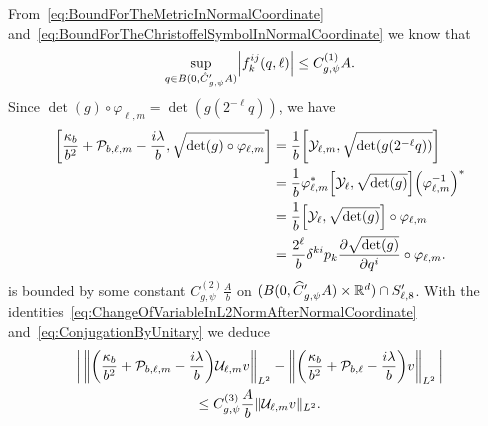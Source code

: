 \documentclass[10pt]{amsart}
\theoremstyle{definition}\newtheorem{defi}[theo]{Definition}\newtheorem{rema}[theo]{Remark}\newtheorem{exam}[theo]{Example}\newtheorem{exem}[theo]{Example}\newtheorem{nota}[theo]{Notation}
\newcommand{\R}{\mathbb{R}}
\newcommand{\clY}{\mathcal{Y}}
\newcommand{\clP}{\mathcal{P}}
\newcommand{\clU}{\mathcal{U}}
\let\oldhat\hat
\renewcommand*{\hat}[1]{\mathchoice{\widehat{#1}}{\widehat{#1}}{\oldhat{#1}}{\oldhat{#1}}}
\let\originalleft\left
\let\originalright\right
\renewcommand{\left}{\mathopen{}\mathclose\bgroup\originalleft}
\renewcommand{\right}{\aftergroup\egroup\originalright}
\begin{document}
From~\eqref{eq:BoundForTheMetricInNormalCoordinate} and~\eqref{eq:BoundForTheChristoffelSymbolInNormalCoordinate} we know that
\begin{equation}\label{eq:BoundForfijk}
\sup_{q\in B(0,\hat{C}'_{g,\psi}A)} \left|f_{k}^{ij}(q,\ell)\right| \leq C_{g,\psi}^{(1)}A .
\end{equation}
Since $\det (g)\circ \varphi_{\ell,m} = \det (g(2^{-\ell}q)) $, we have
\begin{equation}\label{eq:ErrorAfterCommutingWithTheJacobian}
\begin{aligned}[t] \left[\frac{\kappa_{b}}{b^{2}} + \clP_{b,\ell,m}-\frac{i\lambda}{b},\sqrt{\det (g)\circ\varphi_{\ell,m}}\right]
&= \frac{1}{b}\left[\clY_{\ell,m}, \sqrt{\det (g(2^{-\ell}q))} \right] \\
&= \frac{1}{b}\varphi_{\ell,m}^{*}\left[\clY_{\ell},\sqrt{\det (g)}\right] \left(\varphi^{-1}_{\ell,m}\right)^{*} \\
 &= \frac{1}{b}\left[\clY_{\ell}, \sqrt{\det (g)}\right]\circ \varphi_{\ell,m}\\
&= \frac{2^{\ell}}{b}\delta^{ki}p_{k} \frac{\partial \sqrt{\det (g)}}{\partial q^{i}}\circ \varphi_{\ell,m}. 
\end{aligned}
\end{equation}
is bounded by some constant $C_{g,\psi}^{(2)}\frac{A}{b}$ on $(B(0,\hat{C}'_{g,\psi}A)\times \R^d) \cap S_{\ell,8}'$. With the identities~\eqref{eq:ChangeOfVariableInL2NormAfterNormalCoordinate} and~\eqref{eq:ConjugationByUnitary} we deduce
\begin{multline}\label{eq:BoundForTheEquivalenceAfterChangeOfVariableVarphi}
\left|\,\left\| \left(\frac{\kappa_{b}}{b^{2}}+\clP_{b,\ell,m} - \frac{i\lambda}{b}\right)\clU_{\ell,m} v\right\|_{L^2} - \left\| \left(\frac{\kappa_{b}}{b^{2}} + \clP_{b,\ell} - \frac{i\lambda}{b}\right)v \right\|_{L^2}\,\right|\\ \leq C_{g,\psi}^{(3)}\frac{A}{b}\| \clU_{\ell,m} v\|_{L^2}.
\end{multline}
\end{document}
